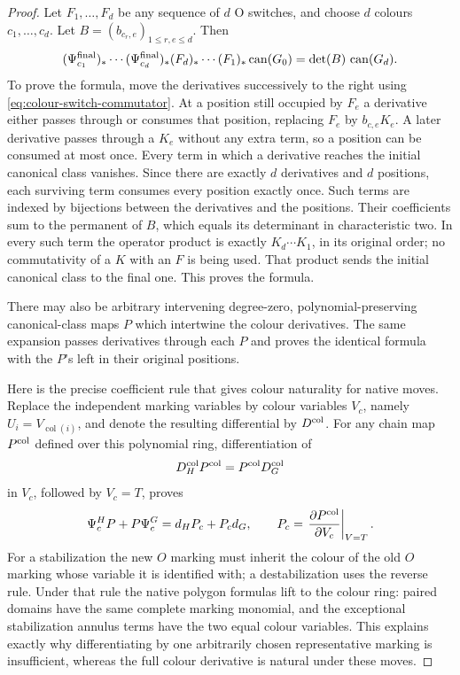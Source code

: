 \documentclass[11pt,a4paper]{article}
\theoremstyle{remark}
\begin{document}
\begin{proof}
Let $F_1,\ldots,F_d$ be any sequence of $d$ O switches, and choose
$d$ colours $c_1,\ldots,c_d$.  Let $B=(b_{c_r,e})_{1\le r,e\le d}$.
Then
\begin{equation}\label{eq:determinant-pairing}
 (\Psi_{c_1}^{\rm final})_*\cdots(\Psi_{c_d}^{\rm final})_*
 (F_d)_*\cdots(F_1)_*\operatorname{can}(G_0)
 =\det(B)\,\operatorname{can}(G_d).
\end{equation}
To prove the formula, move the derivatives successively to the right
using \eqref{eq:colour-switch-commutator}.  At a position still occupied
by $F_e$ a derivative either passes through or consumes that position,
replacing $F_e$ by $b_{c,e}K_e$.  A later derivative passes through a
$K_e$ without any extra term, so a position can be consumed at most once.
Every term in which a derivative reaches the initial canonical class
vanishes.  Since there are exactly $d$ derivatives and $d$ positions,
each surviving term consumes every position exactly once.  Such terms
are indexed by bijections between the derivatives and the positions.
Their coefficients sum to the permanent of $B$, which equals its
determinant in characteristic two.  In every such term the operator
product is exactly $K_d\cdots K_1$, in its original order; no
commutativity of a $K$ with an $F$ is being used.  That product sends the
initial canonical class to the final one.  This proves the formula.

There may also be arbitrary intervening degree-zero, polynomial-preserving
canonical-class maps $P$ which intertwine the colour derivatives.  The
same expansion passes derivatives through each $P$ and proves the
identical formula with the $P$'s left in their original positions.

Here is the precise coefficient rule that gives colour naturality for
native moves.  Replace the independent marking variables by colour
variables $V_c$, namely $U_i=V_{\operatorname{col}(i)}$, and denote the
resulting differential by $D^{\rm col}$.  For any chain map
$P^{\rm col}$ defined over this polynomial ring, differentiation of
\[
 D_H^{\rm col}P^{\rm col}=P^{\rm col}D_G^{\rm col}
\]
in $V_c$, followed by $V_c=T$, proves
\[
 \Psi_c^HP+P\Psi_c^G=d_H P_c+P_cd_G,
 \qquad P_c=\left.\frac{\partial P^{\rm col}}{\partial V_c}\right|_{V=T}.
\]
For a stabilization the new $O$ marking must inherit the colour of the
old $O$ marking whose variable it is identified with; a destabilization
uses the reverse rule.  Under that rule the native polygon formulas
lift to the colour ring: paired domains have the same complete marking
monomial, and the exceptional stabilization annulus terms have the two
equal colour variables.  This explains exactly why differentiating by
one arbitrarily chosen representative marking is insufficient, whereas
the full colour derivative is natural under these moves.


\end{proof}
\end{document}
